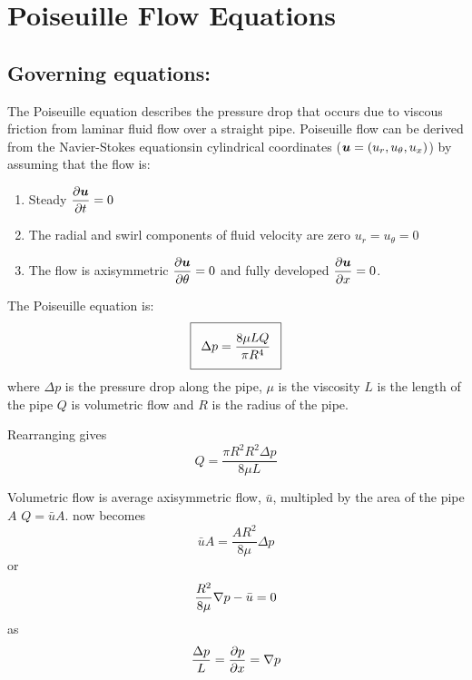 \section{Poiseuille Flow Equations}

\subsection{Governing equations:}

The Poiseuille equation describes the pressure drop that occurs due to viscous
friction from laminar fluid flow over a straight pipe. Poiseuille flow can be
derived from the Navier-Stokes equationsin cylindrical coordinates
($\boldsymbol{u}=\left( u_{r},u_{\theta},u_{x} \right)$) by assuming that the flow
is: \begin{enumerate} \setlength{\itemsep}{1pt} \setlength{\parskip}{0pt}
  \setlength{\parsep}{0pt}
\item Steady \ie $ \dfrac{\partial \boldsymbol{u}}{\partial t} =0$
\item The radial and swirl components of fluid velocity are zero \ie
  $u_{r}=u_{\theta}=0$ 
\item The flow is axisymmetric \ie $ \dfrac{\partial \boldsymbol{u}}{\partial \theta} =0$ and fully developed
  \ie $ \dfrac{\partial \boldsymbol{u}}{\partial x} =0$.
\end{enumerate}

The Poiseuille equation is:
\begin{equation}
  \addtolength{\fboxsep}{5pt}
  \boxed{
    \Delta{p}=\dfrac{8\mu LQ}{\pi R^{4}}
  }
  \label{eqn:Poiseuille_equation}
\end{equation}
where $\Delta{p}$ is the pressure drop along the pipe, $\mu$ is the viscosity $L$
is the length of the pipe $Q$ is volumetric flow and $R$ is the radius of the
pipe. 

Rearranging  gives
\begin{equation}
  Q=\dfrac{\pi R^{2}R^{2}\Delta{p}}{8\mu L}
\end{equation}

Volumetric flow is average axisymmetric flow, $\bar{u}$, multipled by the area
of the pipe $A$ \ie $Q=\bar{u}A$.  now becomes
\begin{equation}
  \bar{u}A=\dfrac{AR^{2}}{8\mu}\Delta{p}
\end{equation}
or 
\begin{equation}
  \dfrac{R^{2}}{8\mu}\gradient{}{p}-\bar{u}=0
\end{equation}
as
\begin{equation}
  \dfrac{\Delta p}{L}=\delby{p}{x}=\gradient{}{p}
\end{equation}

